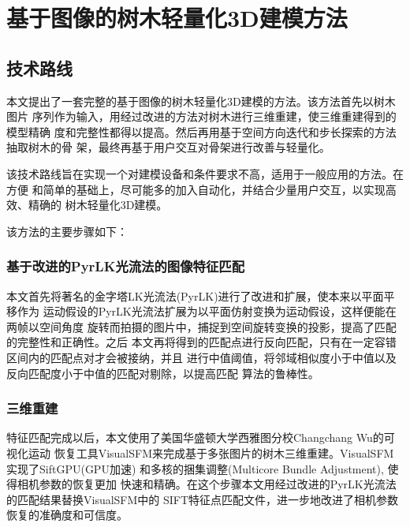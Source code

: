 
\chapter{基于图像的树木轻量化3D建模方法}
\label{cha:techroute}

\section{技术路线}
\label{sec:techroute}
本文提出了一套完整的基于图像的树木轻量化3D建模的方法。该方法首先以树木图片
序列作为输入，用经过改进的方法对树木进行三维重建，使三维重建得到的模型精确
度和完整性都得以提高。然后再用基于空间方向迭代和步长探索的方法抽取树木的骨
架，最终再基于用户交互对骨架进行改善与轻量化。

该技术路线旨在实现一个对建模设备和条件要求不高，适用于一般应用的方法。在方便
和简单的基础上，尽可能多的加入自动化，并结合少量用户交互，以实现高效、精确的
树木轻量化3D建模。

该方法的主要步骤如下：

\subsection{基于改进的PyrLK光流法的图像特征匹配}
\label{subsec:match}
本文首先将著名的金字塔LK光流法(PyrLK)进行了改进和扩展，使本来以平面平移作为
运动假设的PyrLK光流法扩展为以平面仿射变换为运动假设，这样便能在两帧以空间角度
旋转而拍摄的图片中，捕捉到空间旋转变换的投影，提高了匹配的完整性和正确性。之后
本文再将得到的匹配点进行反向匹配，只有在一定容错区间内的匹配点对才会被接纳，并且
进行中值阈值，将邻域相似度小于中值以及反向匹配度小于中值的匹配对剔除，以提高匹配
算法的鲁棒性。

\subsection{三维重建}
\label{subsec:calibration}
特征匹配完成以后，本文使用了美国华盛顿大学西雅图分校Changchang Wu的可视化运动
恢复工具VisualSFM来完成基于多张图片的树木三维重建。VisualSFM实现了SiftGPU(GPU加速)
和多核的捆集调整(Multicore Bundle Adjustment), 使得相机参数的恢复更加
快速和精确。在这个步骤本文用经过改进的PyrLK光流法的匹配结果替换VisualSFM中的
SIFT特征点匹配文件，进一步地改进了相机参数恢复的准确度和可信度。


